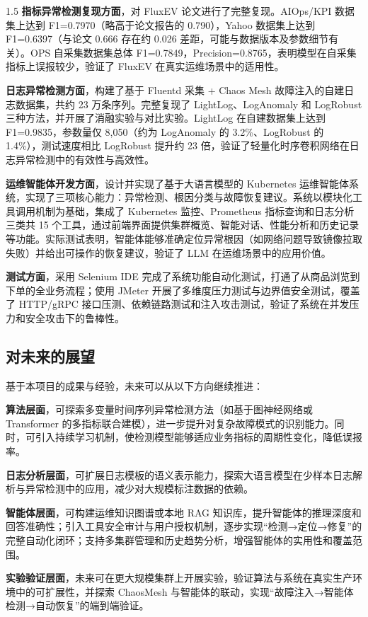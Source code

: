 \documentclass[a4paper,12pt]{report}
\begin{document}
\begin{spacing}{1.5}
\textbf{指标异常检测复现方面}，对 FluxEV 论文进行了完整复现。AIOps/KPI 数据集上达到 F1=0.7970（略高于论文报告的 0.790），Yahoo 数据集上达到 F1=0.6397（与论文 0.666 存在约 0.026 差距，可能与数据版本及参数细节有关）。OPS 自采集数据集总体 F1=0.7849，Precision=0.8765，表明模型在自采集指标上误报较少，验证了 FluxEV 在真实运维场景中的适用性。

\textbf{日志异常检测方面}，构建了基于 Fluentd 采集 + Chaos Mesh 故障注入的自建日志数据集，共约 23 万条序列。完整复现了 LightLog、LogAnomaly 和 LogRobust 三种方法，并开展了消融实验与对比实验。LightLog 在自建数据集上达到 F1=0.9835，参数量仅 8,050（约为 LogAnomaly 的 3.2\%、LogRobust 的 1.4\%），测试速度相比 LogRobust 提升约 23 倍，验证了轻量化时序卷积网络在日志异常检测中的有效性与高效性。

\textbf{运维智能体开发方面}，设计并实现了基于大语言模型的 Kubernetes 运维智能体系统，实现了三项核心能力：异常检测、根因分类与故障恢复建议。系统以模块化工具调用机制为基础，集成了 Kubernetes 监控、Prometheus 指标查询和日志分析三类共 15 个工具，通过前端界面提供集群概览、智能对话、性能分析和历史记录等功能。实际测试表明，智能体能够准确定位异常根因（如网络问题导致镜像拉取失败）并给出可操作的恢复建议，验证了 LLM 在运维场景中的应用价值。

\textbf{测试方面}，采用 Selenium IDE 完成了系统功能自动化测试，打通了从商品浏览到下单的全业务流程；使用 JMeter 开展了多维度压力测试与边界值安全测试，覆盖了 HTTP/gRPC 接口压测、依赖链路测试和注入攻击测试，验证了系统在并发压力和安全攻击下的鲁棒性。

\subsection{对未来的展望}
基于本项目的成果与经验，未来可以从以下方向继续推进：

\textbf{算法层面}，可探索多变量时间序列异常检测方法（如基于图神经网络或 Transformer 的多指标联合建模），进一步提升对复杂故障模式的识别能力。同时，可引入持续学习机制，使检测模型能够适应业务指标的周期性变化，降低误报率。

\textbf{日志分析层面}，可扩展日志模板的语义表示能力，探索大语言模型在少样本日志解析与异常检测中的应用，减少对大规模标注数据的依赖。

\textbf{智能体层面}，可构建运维知识图谱或本地 RAG 知识库，提升智能体的推理深度和回答准确性；引入工具安全审计与用户授权机制，逐步实现“检测→定位→修复”的完整自动化闭环；支持多集群管理和历史趋势分析，增强智能体的实用性和覆盖范围。

\textbf{实验验证层面}，未来可在更大规模集群上开展实验，验证算法与系统在真实生产环境中的可扩展性，并探索 ChaosMesh 与智能体的联动，实现“故障注入→智能体检测→自动恢复”的端到端验证。


\end{spacing}
\end{document}
